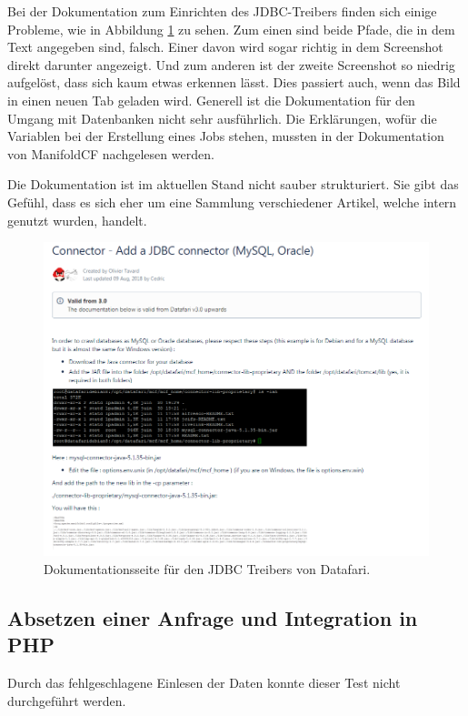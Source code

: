 Bei der Dokumentation zum Einrichten des JDBC-Treibers finden sich einige Probleme, wie in Abbildung \ref{img:datafariJDBC} zu sehen. Zum einen sind beide Pfade, die in dem Text angegeben sind, falsch. Einer davon wird sogar richtig in dem Screenshot direkt darunter angezeigt. Und zum anderen ist der zweite Screenshot so niedrig aufgelöst, dass sich kaum etwas erkennen lässt. Dies passiert auch, wenn das Bild in einen neuen Tab geladen wird. Generell ist die Dokumentation für den Umgang mit Datenbanken nicht sehr ausführlich. Die Erklärungen, wofür die Variablen bei der Erstellung eines Jobs stehen, mussten in der Dokumentation von ManifoldCF nachgelesen werden.

Die Dokumentation ist im aktuellen Stand nicht sauber strukturiert. Sie gibt das Gefühl, dass es sich eher um eine Sammlung verschiedener Artikel, welche intern genutzt wurden, handelt.

\begin{figure}
	\centering
	\includegraphics[width=1\linewidth]{images/datafari_doku_wrong_path.png}
	\caption{Dokumentationsseite für den JDBC Treibers von Datafari.}
	\label{img:datafariJDBC}
\end{figure}


\subsection{Absetzen einer Anfrage und Integration in PHP}

Durch das fehlgeschlagene Einlesen der Daten konnte dieser Test nicht durchgeführt werden.
